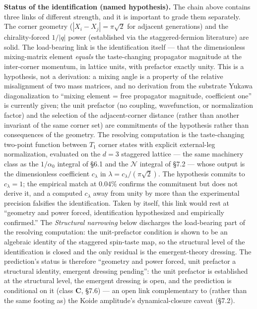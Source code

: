 \documentclass[
]{article}
\begin{document}
\textbf{Status of the identification (named hypothesis).} The chain
above contains three links of different strength, and it is important to
grade them separately. The corner geometry
(\(|X_i - X_j| = \pi\sqrt{2}\) for adjacent generations) and the
chirality-forced \(1/|q|\) power (established via the staggered-fermion
literature) are solid. The load-bearing link is the identification
itself --- that the dimensionless mixing-matrix element \emph{equals}
the taste-changing propagator magnitude at the inter-corner momentum, in
lattice units, with prefactor exactly unity. This is a hypothesis, not a
derivation: a mixing angle is a property of the relative misalignment of
two mass matrices, and no derivation from the substrate Yukawa
diagonalization to ``mixing element = free propagator magnitude,
coefficient one'' is currently given; the unit prefactor (no coupling,
wavefunction, or normalization factor) and the selection of the
adjacent-corner distance (rather than another invariant of the same
corner set) are commitments of the hypothesis rather than consequences
of the geometry. The resolving computation is the taste-changing
two-point function between \(T_1\) corner states with explicit
external-leg normalization, evaluated on the \(d=3\) staggered lattice
--- the same machinery class as the \(1/\alpha_0\) integral of §6.1 and
the \(\mathcal{N}\) integral of §7.2 --- whose output is the
dimensionless coefficient \(c_\lambda\) in
\(\lambda = c_\lambda/(\pi\sqrt{2})\). The hypothesis commits to
\(c_\lambda = 1\); the empirical match at \(0.04\%\) confirms the
commitment but does not derive it, and a computed \(c_\lambda\) away
from unity by more than the experimental precision falsifies the
identification. Taken by itself, this link would rest at ``geometry and
power forced, identification hypothesized and empirically confirmed.''
The \emph{Structural narrowing} below discharges the load-bearing part
of the resolving computation: the unit-prefactor condition is shown to
be an algebraic identity of the staggered spin-taste map, so the
structural level of the identification is closed and the only residual
is the emergent-theory dressing. The prediction's status is therefore
``geometry and power forced, unit prefactor a structural identity,
emergent dressing pending'': the unit prefactor is established at the
structural level, the emergent dressing is open, and the prediction is
conditional on it (class \textbf{C}, §7.6) --- an open link
complementary to (rather than the same footing as) the Koide amplitude's
dynamical-closure caveat (§7.2).
\end{document}
